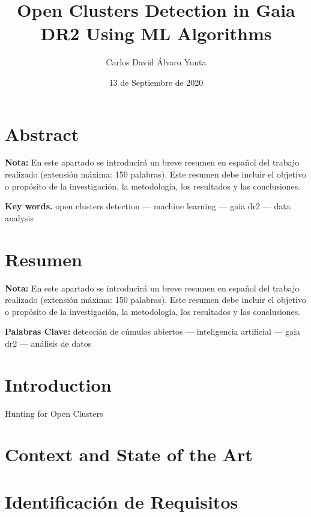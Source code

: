 \documentclass[11pt, a4paper, english]{book}
\title{Open Clusters Detection in Gaia DR2 Using ML Algorithms}
\author{Carlos David Álvaro Yunta}
\date{13 de Septiembre de 2020}
\begin{document}

\maketitle

\frontmatter
\tableofcontents
\listoffigures
\listoftables

\chapter{Abstract}
{\bf Nota:} En este apartado se introducirá un breve resumen en español del trabajo realizado (extensión máxima: 150 palabras). Este resumen debe incluir el objetivo o propósito de la investigación, la metodología, los resultados y las conclusiones.


{\bf Key words.} open clusters detection --- machine learning --- gaia dr2 --- data analysis

\chapter{Resumen}
{\bf Nota:} En este apartado se introducirá un breve resumen en español del trabajo realizado (extensión máxima: 150 palabras). Este resumen debe incluir el objetivo o propósito de la investigación, la metodología, los resultados y las conclusiones.


{\bf Palabras Clave:} detección de cúmulos abiertos --- inteligencia artificial --- gaia dr2 --- análisis de datos

\mainmatter
\chapter{Introduction}

Hunting for Open Clusters\cite{castro2020hunting}

\chapter{Context and State of the Art}

\chapter{Identificación de Requisitos}
\end{document}
